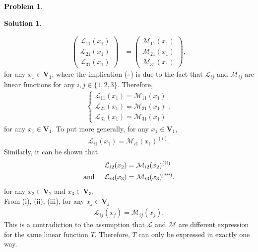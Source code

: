 \documentclass{article}
\theoremstyle{definition}
\newtheorem*{prob*}{Problem}
\newtheorem*{sln*}{Solution}
\newcommand{\V}{\mathbf{V}}
\newcommand{\lag}{\mathcal{L}}
\newcommand{\M}{\mathcal{M}}
\begin{document}
\begin{prob*}
\begin{sln*}
\begin{enumerate}
\begin{align*}
			\begin{pmatrix}
			\lag_{11}(x_1)\\
			\lag_{21}(x_1)\\
			\lag_{31}(x_1)
			\end{pmatrix} 
			&=
			\begin{pmatrix}
			\M_{11}(x_1)\\
			\M_{21}(x_1)\\
			\M_{31}(x_1)
			\end{pmatrix},
			\end{align*}
			for any $x_1 \in \V_1$, where the implication ($\therefore$) is due to the fact that $\lag_{ij}$ and $\M_{ij}$ are linear functions for any $i,j \in \{1,2,3 \}$. Therefore,
			\begin{align*}
			\begin{cases}
			\lag_{11}(x_1) = \M_{11}(x_1)\\
			\lag_{21}(x_1) = \M_{21}(x_1)\\
			\lag_{31}(x_1) = \M_{31}(x_1)
			\end{cases},
			\end{align*}
			for any $x_1 \in \V_1$. To put more generally, for any $x_1 \in \V_1$,
			\begin{align*}
			\lag_{i1}(x_1) = \M_{i1}(x_1)^{(i)}.
			\end{align*}
			Similarly, it can be shown that 
			\begin{align*}
			&\lag_{i2}(x_2) = \M_{i2}(x_2)^{(ii)}\\
			\text{and}\hspace{0.5cm} &\lag_{i3}(x_3) = \M_{i3}(x_3)^{(iii)}.
			\end{align*}
			for any $x_2 \in \V_2$ and $x_3\in \V_3$. \\
			
			From (i), (ii), (iii), for any $x_j \in \V_j$
			\begin{align*}
			\lag_{ij}(x_j) = \M_{ij}(x_j).
			\end{align*}
			This is a contradiction to the assumption that $\lag$ and $\M$ are different expression for the same linear function $T$. Therefore, $T$ can only be expressed in exactly one way. \\
			
			\newpage
			

\end{enumerate}
\end{sln*}
\end{prob*}
\end{document}
